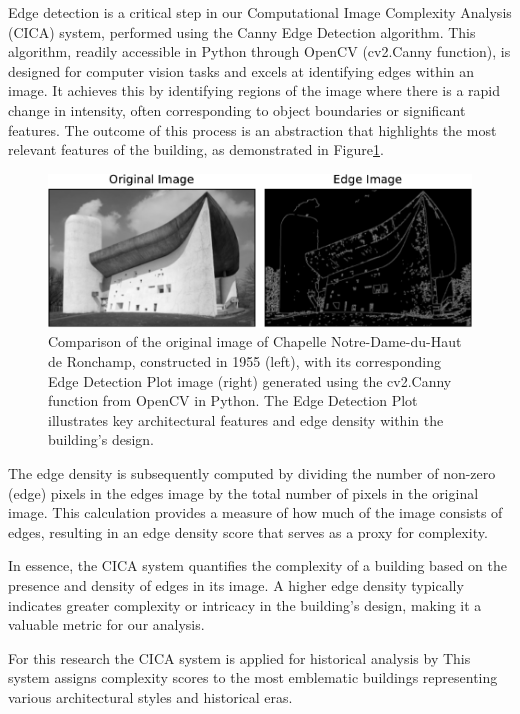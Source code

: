 Edge detection is a critical step in our Computational Image Complexity Analysis (CICA) system, performed using the Canny Edge Detection algorithm\cite{OpenCV2023}.
This algorithm, readily accessible in Python through OpenCV (cv2.Canny function), is designed for computer vision tasks and excels at identifying edges within an image.
It achieves this by identifying regions of the image where there is a rapid change in intensity, often corresponding to object boundaries or significant features.
The outcome of this process is an abstraction that highlights the most relevant features of the building, as demonstrated in Figure\ref{fig:CannyEdgePlotHistory}.

     \begin{figure}[htb]
          \centering
          \includegraphics[width= \linewidth]{Images/CannyEdgePlotHistory}
          \caption{Comparison of the original image of Chapelle Notre-Dame-du-Haut de Ronchamp, constructed in 1955 (left), with its corresponding Edge Detection Plot image (right) generated using the cv2.Canny function from OpenCV in Python. The Edge Detection Plot illustrates key architectural features and edge density within the building's design.}
          \label{fig:CannyEdgePlotHistory}
        \end{figure}

The edge density is subsequently computed by dividing the number of non-zero (edge) pixels in the edges image by the total number of pixels in the original image.
This calculation provides a measure of how much of the image consists of edges, resulting in an edge density score that serves as a proxy for complexity.

In essence, the CICA system quantifies the complexity of a building based on the presence and density of edges in its image.
A higher edge density typically indicates greater complexity or intricacy in the building's design, making it a valuable metric for our analysis.

For this research the CICA system is applied for historical analysis by
This system assigns complexity scores to the most emblematic buildings representing various architectural styles and historical eras.

